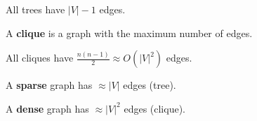 \begin{note}
	All trees have \( |V|-1 \) edges.
\end{note}

\begin{definition}
	A \textbf{clique} is a graph with the maximum number of edges.
\end{definition}

\begin{note}
	All cliques have \( \frac{n(n-1)}{2} \approx O(|V|^2)\) edges.
\end{note}

\begin{definition}
	A \textbf{sparse} graph has \( \approx |V| \) edges (tree).
\end{definition}

\begin{definition}
	A \textbf{dense} graph has \( \approx |V|^2 \) edges (clique).
\end{definition}
